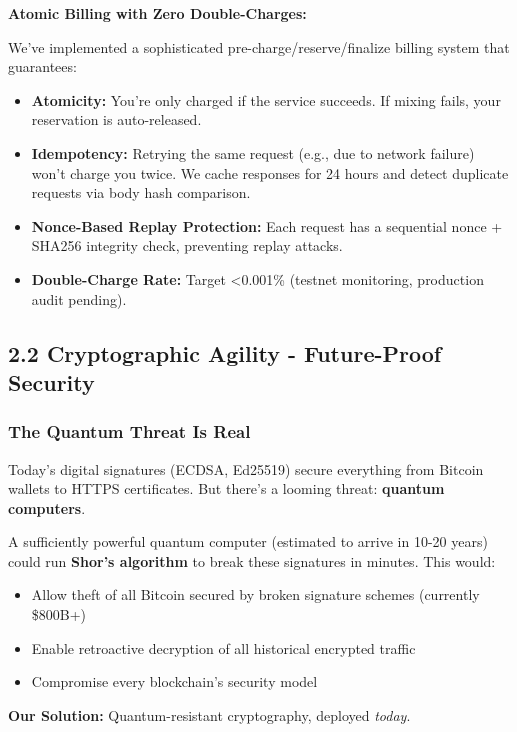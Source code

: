 \documentclass[11pt,a4paper]{article}
\begin{document}
\textbf{Atomic Billing with Zero Double-Charges:}

We've implemented a sophisticated pre-charge/reserve/finalize billing system that guarantees:
\begin{itemize}
    \item \textbf{Atomicity:} You're only charged if the service succeeds. If mixing fails, your reservation is auto-released.

    \item \textbf{Idempotency:} Retrying the same request (e.g., due to network failure) won't charge you twice. We cache responses for 24 hours and detect duplicate requests via body hash comparison.

    \item \textbf{Nonce-Based Replay Protection:} Each request has a sequential nonce + SHA256 integrity check, preventing replay attacks.

    \item \textbf{Double-Charge Rate:} Target <0.001\% (testnet monitoring, production audit pending).
\end{itemize}

\subsection{2.2 Cryptographic Agility - Future-Proof Security}

\subsubsection{The Quantum Threat Is Real}

Today's digital signatures (ECDSA, Ed25519) secure everything from Bitcoin wallets to HTTPS certificates. But there's a looming threat: \textbf{quantum computers}.

A sufficiently powerful quantum computer (estimated to arrive in 10-20 years) could run \textbf{Shor's algorithm} to break these signatures in minutes. This would:
\begin{itemize}
    \item Allow theft of all Bitcoin secured by broken signature schemes (currently \$800B+)
    \item Enable retroactive decryption of all historical encrypted traffic
    \item Compromise every blockchain's security model
\end{itemize}

\textbf{Our Solution:} Quantum-resistant cryptography, deployed \textit{today}.
\end{document}
